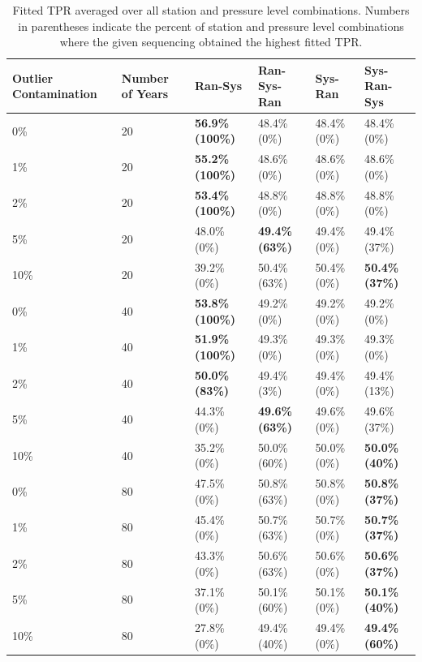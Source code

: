 \documentclass[12pt]{article}
\begin{document}
\begin{landscape}
\begin{table}[ht]
	\centering
	\begin{tabular}{ll|llll}
  		\hline
		Outlier Contamination & Number of Years & Ran-Sys & Ran-Sys-Ran & Sys-Ran & Sys-Ran-Sys\\ 
 		\hline
		0\% & 20 & \textbf{56.9\% (100\%)} & 48.4\% (0\%) & 48.4\% (0\%) & 48.4\% (0\%) \\ 
		1\% & 20 & \textbf{55.2\% (100\%)} & 48.6\% (0\%) & 48.6\% (0\%) & 48.6\% (0\%) \\ 
		2\% & 20 & \textbf{53.4\% (100\%)} & 48.8\% (0\%) & 48.8\% (0\%) & 48.8\% (0\%) \\ 
		5\% & 20 & 48.0\% (0\%) & \textbf{49.4\% (63\%)} & 49.4\% (0\%) & 49.4\% (37\%) \\ 
		10\% & 20 & 39.2\% (0\%) & 50.4\% (63\%) & 50.4\% (0\%) & \textbf{50.4\% (37\%)} \\ 
		\hline
		0\% & 40 & \textbf{53.8\% (100\%)} & 49.2\% (0\%) & 49.2\% (0\%) & 49.2\% (0\%) \\ 
		1\% & 40 & \textbf{51.9\% (100\%)} & 49.3\% (0\%) & 49.3\% (0\%) & 49.3\% (0\%) \\ 
		2\% & 40 & \textbf{50.0\% (83\%)} & 49.4\% (3\%) & 49.4\% (0\%) & 49.4\% (13\%) \\ 
		5\% & 40 & 44.3\% (0\%) & \textbf{49.6\% (63\%)} & 49.6\% (0\%) & 49.6\% (37\%) \\ 
		10\% & 40 & 35.2\% (0\%) & 50.0\% (60\%) & 50.0\% (0\%) & \textbf{50.0\% (40\%)} \\ 
		\hline
		0\% & 80 & 47.5\% (0\%) & 50.8\% (63\%) & 50.8\% (0\%) & \textbf{50.8\% (37\%)} \\ 
		1\% & 80 & 45.4\% (0\%) & 50.7\% (63\%) & 50.7\% (0\%) & \textbf{50.7\% (37\%)} \\ 
		2\% & 80 & 43.3\% (0\%) & 50.6\% (63\%) & 50.6\% (0\%) & \textbf{50.6\% (37\%)} \\ 
		5\% & 80 & 37.1\% (0\%) & 50.1\% (60\%) & 50.1\% (0\%) & \textbf{50.1\% (40\%)} \\ 
		10\% & 80 & 27.8\% (0\%) & 49.4\% (40\%) & 49.4\% (0\%) & \textbf{49.4\% (60\%)} \\ 
		\hline
	\end{tabular}
	\caption{Fitted TPR averaged over all station and pressure level combinations.  Numbers in parentheses indicate the percent of station and pressure level combinations where the given sequencing obtained the highest fitted TPR.}
	\label{tab:fitTPR}
\end{table}
\end{landscape}
\end{document}

